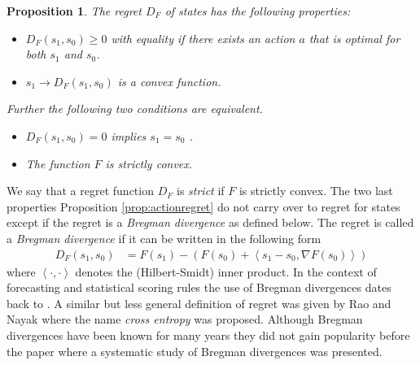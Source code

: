 \documentclass[10pt,a4paper,draft]{article}
\newtheorem{Prop}{Proposition}
\begin{document}
\begin{Prop}\label{prop:regretproperties}
The regret $D_{F}$ of states has the following properties:
\begin{itemize}
\item $D_{F}\left(s_{1},s_{0}\right)\geq0$ with equality if
there exists an action $a$ that is optimal for both $s_1$ and
$s_0$.
\item $s_1 \to D_{F}\left(s_1 ,s_0 \right)$ is a convex
function.
\end{itemize}
Further the following two conditions are equivalent.
\begin{itemize}
\item $D_{F}\left(s_{1},s_{0}\right)= 0$ implies $s_1 =s_0$ .
\item The function $F$ is strictly convex.
\end{itemize}
\end{Prop}
We say that a regret function $D_F$ is {\em strict} if $F$ is strictly convex. The two last properties Proposition \ref{prop:actionregret} do not carry over to regret for states except if the regret is a {\em Bregman
divergence} as defined below.
The regret is called a \emph{Bregman divergence} if it can be written in the following form
\begin{align}
D_{F}\left(s_{1},s_{0}\right) &
=F\left(s_{1}\right)-\left(F\left(s_{0}\right)+\left\langle
s_{1}-s_{0},\nabla F\left(s_{0}\right)\right\rangle \right)
\end{align}
where $\left\langle \cdot,\cdot\right\rangle $ denotes the (Hilbert-Smidt) 
inner product. In the context of forecasting and
statistical scoring rules the use of Bregman divergences dates back to
\cite{Hendrickson1971}. A similar but less general definition of regret was given by Rao
and Nayak \cite{Rao1985} where the name \emph{cross entropy} was
proposed. Although Bregman divergences have been known for many years they did not gain popularity before the paper \cite{Banerjee2005} where a systematic study of Bregman divergences was presented.
\end{document}
